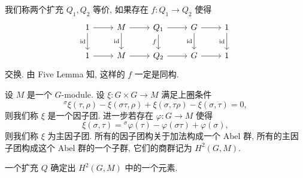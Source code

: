\begin{defin}[等价的扩充]
我们称两个扩充 $Q_1, Q_2$ 等价, 如果存在 $f: Q_1 \to Q_2$ 使得
\[
\begin{tikzcd}
	1 & M & {Q_1} & G & 1 \\
	1 & M & {Q_2} & G & 1
	\arrow[from=1-1, to=1-2]
	\arrow[from=1-2, to=1-3]
	\arrow[from=1-3, to=1-4]
	\arrow[from=1-4, to=1-5]
	\arrow[from=2-1, to=2-2]
	\arrow[from=2-2, to=2-3]
	\arrow[from=2-3, to=2-4]
	\arrow[from=2-4, to=2-5]
	\arrow["{\mathrm{id}}"', from=1-1, to=2-1]
	\arrow["{\mathrm{id}}"', from=1-2, to=2-2]
	\arrow["f"', from=1-3, to=2-3]
	\arrow["{\mathrm{id}}"', from=1-4, to=2-4]
	\arrow["{\mathrm{id}}"', from=1-5, to=2-5]
\end{tikzcd}
\]
交换. 由 Five Lemma 知, 这样的 $f$ 一定是同构.
\end{defin}

\begin{defin}[因子团]
设 $M$ 是一个 $G$-module.
设 $\xi: G \times G \to M$ 满足上圈条件
\begin{equation}
\label{eq:cocycle}
{}^\sigma\xi(\tau,\rho) - \xi(\sigma\tau,\rho) + \xi(\sigma,\tau\rho) - \xi(\sigma,\tau) = 0,
\end{equation}
则我们称 $\xi$ 是一个因子团. 进一步若存在 $\varphi: G \to M$ 使得
\begin{equation}
\xi(\sigma,\tau) = {}^\sigma\varphi(\tau) - \varphi(\sigma\tau) + \varphi(\sigma),
\end{equation}
则我们称 $\xi$ 为主因子团.
所有的因子团构关于加法构成一个 Abel 群, 所有的主因子团构成这个 Abel 群的一个子群,
它们的商群记为 $H^2(G, M)$.
\end{defin}

\begin{prop}
\label{prop:Q-determine-cohomology}
一个扩充 $Q$ 确定出 $H^2(G, M)$ 中的一个元素.
\end{prop}

